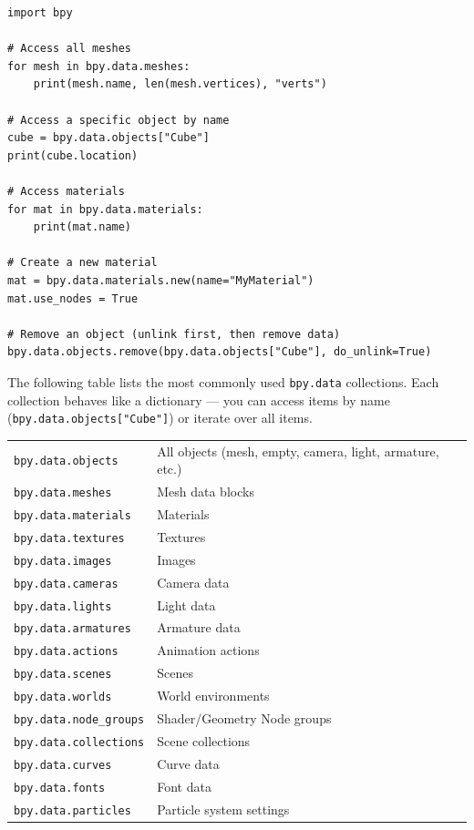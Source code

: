 \begin{lstlisting}
import bpy

# Access all meshes
for mesh in bpy.data.meshes:
    print(mesh.name, len(mesh.vertices), "verts")

# Access a specific object by name
cube = bpy.data.objects["Cube"]
print(cube.location)

# Access materials
for mat in bpy.data.materials:
    print(mat.name)

# Create a new material
mat = bpy.data.materials.new(name="MyMaterial")
mat.use_nodes = True

# Remove an object (unlink first, then remove data)
bpy.data.objects.remove(bpy.data.objects["Cube"], do_unlink=True)
\end{lstlisting}

The following table lists the most commonly used \texttt{bpy.data} collections. Each collection behaves like a dictionary --- you can access items by name (\texttt{bpy.data.objects["Cube"]}) or iterate over all items.

\begin{center}
\begin{tabularx}{\textwidth}{L{4.5cm}X}
\toprule
{}
 &  \\
\midrule
\texttt{bpy.data.objects} & All objects (mesh, empty, camera, light, armature, etc.) \\
\texttt{bpy.data.meshes} & Mesh data blocks \\
\texttt{bpy.data.materials} & Materials \\
\texttt{bpy.data.textures} & Textures \\
\texttt{bpy.data.images} & Images \\
\texttt{bpy.data.cameras} & Camera data \\
\texttt{bpy.data.lights} & Light data \\
\texttt{bpy.data.armatures} & Armature data \\
\texttt{bpy.data.actions} & Animation actions \\
\texttt{bpy.data.scenes} & Scenes \\
\texttt{bpy.data.worlds} & World environments \\
\texttt{bpy.data.node\_groups} & Shader/Geometry Node groups \\
\texttt{bpy.data.collections} & Scene collections \\
\texttt{bpy.data.curves} & Curve data \\
\texttt{bpy.data.fonts} & Font data \\
\texttt{bpy.data.particles} & Particle system settings \\
\bottomrule
\end{tabularx}
\end{center}

